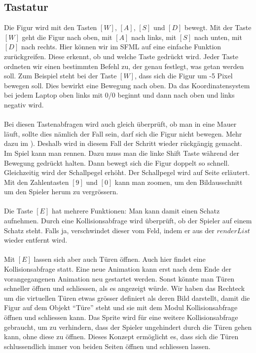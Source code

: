\documentclass[11pt,a4paper]{scrbook}
\newcommand{\q}[1]{``#1''}
\newcommand{\key}[1]{$[#1]$}
\begin{document}
\subsection{Tastatur}
Die Figur wird mit den Tasten \key{W}, \key{A}, \key{S} und \key{D} bewegt. Mit der Taste \key{W} geht die Figur nach oben, mit \key{A} nach links, mit \key{S} nach unten, mit \key{D} nach rechts. Hier können wir im SFML auf eine einfache Funktion zurückgreifen. Diese erkennt, ob und welche Taste gedrückt wird. Jeder Taste ordneten wir einen bestimmten Befehl zu, der genau festlegt, was getan werden soll. Zum Beispiel steht bei der Taste \key{W}, dass sich die Figur um -5 Pixel bewegen soll. Dies bewirkt eine Bewegung nach oben. Da das Koordinatensystem bei jedem Laptop oben links mit 0/0 beginnt und dann nach oben und links negativ wird.\\
\\
Bei diesen Tastenabfragen wird auch gleich überprüft, ob man in eine Mauer läuft, sollte dies nämlich der Fall sein, darf sich die Figur nicht bewegen. Mehr dazu im ). 
Deshalb wird in diesem Fall der Schritt wieder rückgängig gemacht. 
Im Spiel kann man rennen. 
Dazu muss man die linke Shift Taste während der Bewegung gedrückt halten. Dann bewegt sich die Figur doppelt so schnell. Gleichzeitig wird der Schallpegel erhöht. 
Der Schallpegel wird auf Seite \pageref{Schall} erläutert.
Mit den Zahlentasten \key{9} und \key{0} kann man zoomen, um den Bildausschnitt um den Spieler herum zu vergrössern.\\
\\
Die Taste \key{E} hat mehrere Funktionen: Man kann damit einen Schatz aufnehmen. 
Durch eine Kollisionsabfrage wird überprüft, ob der Spieler auf einem Schatz steht. 
Falls ja, verschwindet dieser vom Feld, indem er aus der $renderList$  wieder entfernt wird.\\
\\
Mit \key{E} lassen sich aber auch Türen öffnen. 
Auch hier findet eine Kollisionsabfrage statt. 
Eine neue Animation kann erst nach dem Ende der vorangegangenen Animation neu gestartet werden. 
Sonst könnte man Türen schneller öffnen und schliessen, als es angezeigt würde. 
Wir haben das Rechteck um die virtuellen Türen etwas grösser definiert als deren Bild darstellt, damit die Figur auf dem Objekt \q{Türe} steht und sie mit dem Modul Kollisionsabfrage öffnen und schliessen kann. Das Sprite wird für eine weitere Kollisionsabfrage gebraucht, um zu verhindern, dass der Spieler ungehindert durch die Türen gehen kann, ohne diese zu öffnen. 
Dieses Konzept ermöglicht es, dass sich die Türen schlussendlich immer von beiden Seiten öffnen und schliessen lassen.
\end{document}
